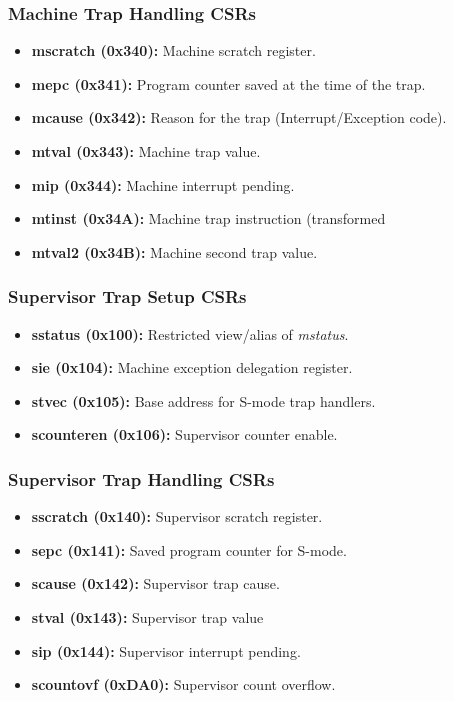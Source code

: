 	\subsubsection{Machine Trap Handling CSRs}
		\begin{itemize}
			\item \textbf{mscratch (0x340):} Machine scratch register.
			\item \textbf{mepc (0x341):} Program counter saved at the time of the trap.
			\item \textbf{mcause (0x342):} Reason for the trap (Interrupt/Exception code).
			\item \textbf{mtval (0x343):} Machine trap value.
			\item \textbf{mip (0x344):} Machine interrupt pending.
			\item \textbf{mtinst (0x34A):} Machine trap instruction (transformed
			\item \textbf{mtval2 (0x34B):} Machine second trap value.
		\end{itemize}
	
	\subsubsection{Supervisor Trap Setup CSRs}
		\begin{itemize}
			\item \textbf{sstatus (0x100):} Restricted view/alias of \textit{mstatus}.
			\item \textbf{sie (0x104):} Machine exception delegation register.
			\item \textbf{stvec (0x105):} Base address for S-mode trap handlers.
			\item \textbf{scounteren (0x106):} Supervisor counter enable.
		\end{itemize}
	
	\subsubsection{Supervisor Trap Handling CSRs}
		\begin{itemize}
			\item \textbf{sscratch (0x140):} Supervisor scratch register.
			\item \textbf{sepc (0x141):} Saved program counter for S-mode.
			\item \textbf{scause (0x142):} Supervisor trap cause.
			\item \textbf{stval (0x143):} Supervisor trap value
			\item \textbf{sip (0x144):} Supervisor interrupt pending.
			\item \textbf{scountovf (0xDA0):} Supervisor count overflow.
		\end{itemize}

